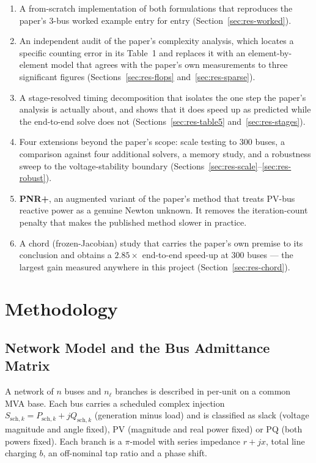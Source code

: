 \documentclass[sigconf,nonacm]{acmart}
\begin{document}
\begin{enumerate}
\item A from-scratch implementation of both formulations that reproduces the
      paper's 3-bus worked example entry for entry
      (Section~\ref{sec:res-worked}).
\item An independent audit of the paper's complexity analysis, which locates a
      specific counting error in its Table~1 and replaces it with an
      element-by-element model that agrees with the paper's own measurements to
      three significant figures (Sections~\ref{sec:res-flops}
      and~\ref{sec:res-sparse}).
\item A stage-resolved timing decomposition that isolates the one step the
      paper's analysis is actually about, and shows that it does speed up as
      predicted while the end-to-end solve does not
      (Sections~\ref{sec:res-table5} and~\ref{sec:res-stages}).
\item Four extensions beyond the paper's scope: scale testing to 300 buses, a
      comparison against four additional solvers, a memory study, and a
      robustness sweep to the voltage-stability boundary
      (Sections~\ref{sec:res-scale}--\ref{sec:res-robust}).
\item \textbf{PNR+}, an augmented variant of the paper's method that treats
      PV-bus reactive power as a genuine Newton unknown. It removes the
      iteration-count penalty that makes the published method slower in
      practice.
\item A chord (frozen-Jacobian) study that carries the paper's own premise to
      its conclusion and obtains a $2.85\times$ end-to-end speed-up at 300
      buses --- the largest gain measured anywhere in this project
      (Section~\ref{sec:res-chord}).
\end{enumerate}

\section{Methodology}

\subsection{Network Model and the Bus Admittance Matrix}
A network of $n$ buses and $n_\ell$ branches is described in per-unit on a
common MVA base. Each bus carries a scheduled complex injection
$S_{\mathrm{sch},k} = P_{\mathrm{sch},k} + jQ_{\mathrm{sch},k}$ (generation minus
load) and is classified as slack (voltage magnitude and angle fixed), PV
(magnitude and real power fixed) or PQ (both powers fixed). Each branch is a
$\pi$-model with series impedance $r+jx$, total line charging $b$, an
off-nominal tap ratio and a phase shift.
\end{document}
